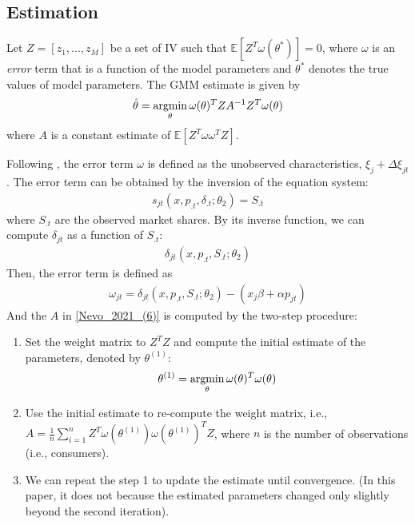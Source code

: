 \documentclass[11pt]{elegantbook}
\newcommand{\argmin}{\operatornamewithlimits{argmin}}
\begin{document}
\subsection{Estimation}
Let $Z=[z_1,...,z_M]$ be a set of IV such that $\mathbb{E}[Z^T\omega(\theta^*)]=0$, where $\omega$ is an \textit{error} term that is a function of the model parameters and $\theta^*$ denotes the true values of model parameters. The GMM estimate is given by
\begin{equation}
    \begin{aligned}
        \hat{\theta}=\argmin_{\theta}\omega(\theta)^TZA^{-1}Z^T\omega(\theta)
    \end{aligned}
    \label{Nevo_2021_(6)}
\end{equation}
where $A$ is a constant estimate of $\mathbb{E}[Z^T\omega\omega^TZ]$.

Following \cite{berry1994estimating}, the error term $\omega$ is defined as the unobserved characteristics, $\xi_j+\Delta\xi_{jt}$. The error term can be obtained by the inversion of the equation system:
\begin{equation}
    \begin{aligned}
        s_{jt}\left(x,p_{.t},\delta_{.t};\theta_2\right)=S_{.t}
    \end{aligned}
    \label{Nevo_2021_(7)}
\end{equation}
where $S_{.t}$ are the observed market shares. By its inverse function, we can compute $\delta_{jt}$ as a function of $S_{.t}$:
\begin{equation}
    \begin{aligned}
        \delta_{jt}(x,p_{.t},S_{.t};\theta_2)
    \end{aligned}
    \nonumber
\end{equation}
Then, the error term is defined as
\begin{equation}
    \begin{aligned}
        \omega_{jt}=\delta_{jt}(x,p_{.t},S_{.t};\theta_2)-(x_j\beta+\alpha p_{jt})
    \end{aligned}
    \nonumber
\end{equation}
And the $A$ in \eqref{Nevo_2021_(6)} is computed by the two-step procedure:
\begin{enumerate}
    \item Set the weight matrix to $Z^T Z$ and compute the initial estimate of the parameters, denoted by $\theta^{(1)}$:
    \begin{equation}
        \begin{aligned}
            \theta^{(1)}=\argmin_{\theta} \omega(\theta)^T\omega(\theta)
        \end{aligned}
        \nonumber
    \end{equation}
    \item Use the initial estimate to re-compute the weight matrix, i.e., $A=\frac{1}{n}\sum_{i=1}^n Z^T\omega(\theta^{(1)})\omega(\theta^{(1)})^TZ$, where $n$ is the number of observations (i.e., consumers).
    \item We can repeat the step 1 to update the estimate until convergence. (In this paper, it does not because the estimated parameters changed only slightly beyond the second iteration).
\end{enumerate}
\end{document}
